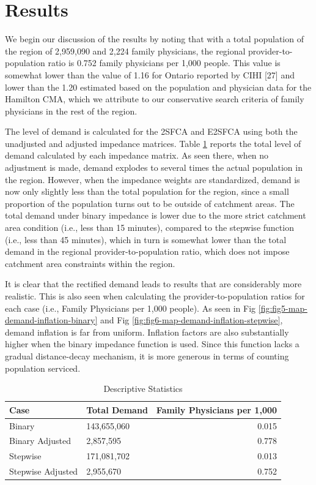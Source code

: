 \documentclass[10pt,letterpaper]{article}
\begin{document}
\section{Results}\label{results}

We begin our discussion of the results by noting that with a total
population of the region of 2,959,090 and 2,224 family physicians, the
regional provider-to-population ratio is 0.752 family physicians per
1,000 people. This value is somewhat lower than the value of 1.16 for
Ontario reported by CIHI {[}27{]} and lower than the 1.20 estimated
based on the population and physician data for the Hamilton CMA, which
we attribute to our conservative search criteria of family physicians in
the rest of the region.

The level of demand is calculated for the 2SFCA and E2SFCA using both
the unadjusted and adjusted impedance matrices. Table
\ref{tab:table-descriptive-statistics} reports the total level of demand
calculated by each impedance matrix. As seen there, when no adjustment
is made, demand explodes to several times the actual population in the
region. However, when the impedance weights are standardized, demand is
now only slightly less than the total population for the region, since a
small proportion of the population turns out to be outside of catchment
areas. The total demand under binary impedance is lower due to the more
strict catchment area condition (i.e., less than 15 minutes), compared
to the stepwise function (i.e., less than 45 minutes), which in turn is
somewhat lower than the total demand in the regional
provider-to-population ratio, which does not impose catchment area
constraints within the region.

It is clear that the rectified demand leads to results that are
considerably more realistic. This is also seen when calculating the
provider-to-population ratios for each case (i.e., Family Physicians per
1,000 people). As seen in Fig \ref{fig:fig5-map-demand-inflation-binary}
and Fig \ref{fig:fig6-map-demand-inflation-stepwise}, demand inflation
is far from uniform. Inflation factors are also substantially higher
when the binary impedance function is used. Since this function lacks a
gradual distance-decay mechanism, it is more generous in terms of
counting population serviced.

\begin{table}[t]

\caption{\label{tab:table-descriptive-statistics}\label{tab:table-descriptive-statistics}Descriptive Statistics}
\centering
\begin{tabular}{llr}
\toprule
Case & Total Demand & Family Physicians per 1,000\\
\midrule
Binary & 143,655,060 & 0.015\\
Binary Adjusted & 2,857,595 & 0.778\\
Stepwise & 171,081,702 & 0.013\\
Stepwise Adjusted & 2,955,670 & 0.752\\
\bottomrule
\end{tabular}
\end{table}
\end{document}
